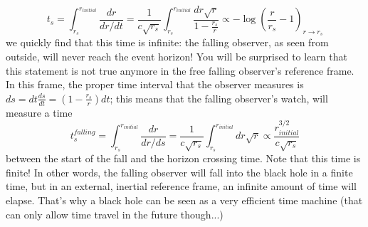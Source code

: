 \documentclass[11pt, a4paper,oneside,openright]{book}
\numberwithin{equation}{section}
\begin{document}
\begin{equation}
t_s = \int_{r_s}^{r_{initial}}\frac{dr}{dr/dt} = \frac{1}{c\sqrt{r_s}}\int_{r_s}^{r_{initial}}\frac{dr\sqrt{r}}{1-\frac{r_s}{r}}\propto -\log\left(\frac{r}{r_s}-1\right)_{r\rightarrow r_s}
\end{equation}
we quickly find that this time is infinite: the falling observer, as seen from outside, will never reach the event horizon! You will be surprised to learn that this statement is not true anymore in the free falling observer's reference frame. In this frame, the proper time interval that the observer measures is $ds = dt\frac{ds}{dt} = \left(1-\frac{r_s}{r}\right)dt$; this means that the falling observer's watch, will measure a time
\begin{equation}
t^{falling}_s = \int_{r_s}^{r_{initial}}\frac{dr}{dr/ds} = \frac{1}{c\sqrt{r_s}}\int_{r_s}^{r_{initial}}dr\sqrt{r}\propto \frac{r_{initial}^{3/2}}{c\sqrt{r_s}}
\end{equation}
between the start of the fall and the horizon crossing time. Note that this time is finite! In other words, the falling observer will fall into the black hole in a finite time, but in an external, inertial reference frame, an infinite amount of time will elapse. That's why a black hole can be seen as a very efficient time machine (that can only allow time travel in the future though...)
\end{document}
